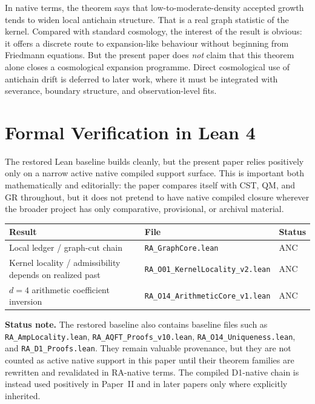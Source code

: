\documentclass[11pt]{article}
\begin{document}
In native terms, the theorem says that low-to-moderate-density accepted growth tends to widen local antichain structure. That is a real graph statistic of the kernel. Compared with standard cosmology, the interest of the result is obvious: it offers a discrete route to expansion-like behaviour without beginning from Friedmann equations. But the present paper does \emph{not} claim that this theorem alone closes a cosmological expansion programme. Direct cosmological use of antichain drift is deferred to later work, where it must be integrated with severance, boundary structure, and observation-level fits.

\section{Formal Verification in Lean 4}
\label{sec:lean}

The restored Lean baseline builds cleanly, but the present paper relies positively only on a narrow active native compiled support surface. This is important both mathematically and editorially: the paper compares itself with CST, QM, and GR throughout, but it does not pretend to have native compiled closure wherever the broader project has only comparative, provisional, or archival material.

\begin{center}
\begin{tabular}{lll}
\toprule
Result & File & Status \\
\midrule
Local ledger / graph-cut chain & \texttt{RA\_GraphCore.lean} & ANC \\
Kernel locality / admissibility depends on realized past & \texttt{RA\_O01\_KernelLocality\_v2.lean} & ANC \\
$d=4$ arithmetic coefficient inversion & \texttt{RA\_O14\_ArithmeticCore\_v1.lean} & ANC \\
\bottomrule
\end{tabular}
\end{center}

\noindent\textbf{Status note.} The restored baseline also contains baseline files such as \texttt{RA\_AmpLocality.lean}, \texttt{RA\_AQFT\_Proofs\_v10.lean}, \texttt{RA\_O14\_Uniqueness.lean}, and \texttt{RA\_D1\_Proofs.lean}. They remain valuable provenance, but they are not counted as active native support in this paper until their theorem families are rewritten and revalidated in RA-native terms. The compiled D1-native chain is instead used positively in Paper~II and in later papers only where explicitly inherited.
\end{document}
